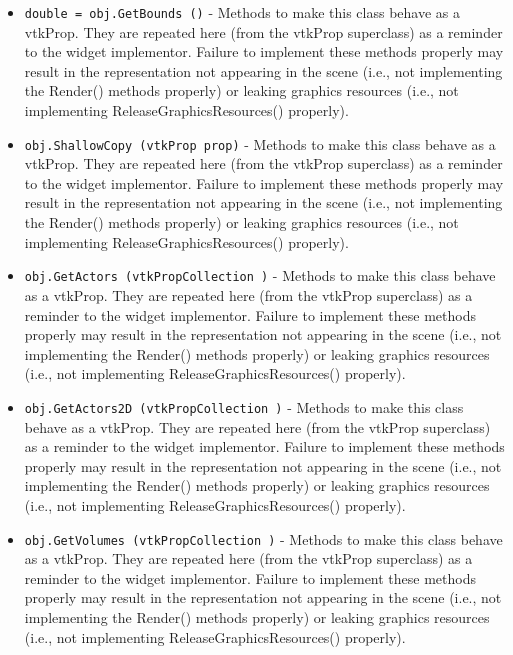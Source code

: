 \begin{itemize}
\item  \verb|double = obj.GetBounds ()| -  Methods to make this class behave as a vtkProp. They are repeated here (from the
 vtkProp superclass) as a reminder to the widget implementor. Failure to implement
 these methods properly may result in the representation not appearing in the scene
 (i.e., not implementing the Render() methods properly) or leaking graphics resources
 (i.e., not implementing ReleaseGraphicsResources() properly).

\item  \verb|obj.ShallowCopy (vtkProp prop)| -  Methods to make this class behave as a vtkProp. They are repeated here (from the
 vtkProp superclass) as a reminder to the widget implementor. Failure to implement
 these methods properly may result in the representation not appearing in the scene
 (i.e., not implementing the Render() methods properly) or leaking graphics resources
 (i.e., not implementing ReleaseGraphicsResources() properly).

\item  \verb|obj.GetActors (vtkPropCollection )| -  Methods to make this class behave as a vtkProp. They are repeated here (from the
 vtkProp superclass) as a reminder to the widget implementor. Failure to implement
 these methods properly may result in the representation not appearing in the scene
 (i.e., not implementing the Render() methods properly) or leaking graphics resources
 (i.e., not implementing ReleaseGraphicsResources() properly).

\item  \verb|obj.GetActors2D (vtkPropCollection )| -  Methods to make this class behave as a vtkProp. They are repeated here (from the
 vtkProp superclass) as a reminder to the widget implementor. Failure to implement
 these methods properly may result in the representation not appearing in the scene
 (i.e., not implementing the Render() methods properly) or leaking graphics resources
 (i.e., not implementing ReleaseGraphicsResources() properly).

\item  \verb|obj.GetVolumes (vtkPropCollection )| -  Methods to make this class behave as a vtkProp. They are repeated here (from the
 vtkProp superclass) as a reminder to the widget implementor. Failure to implement
 these methods properly may result in the representation not appearing in the scene
 (i.e., not implementing the Render() methods properly) or leaking graphics resources
 (i.e., not implementing ReleaseGraphicsResources() properly).


\end{itemize}
